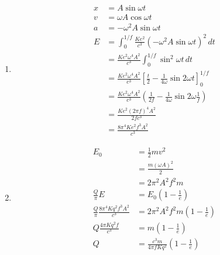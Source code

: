 \documentclass{article}
\begin{document}
\begin{enumerate}
  \item

        \begin{align*}
          x & = A \sin \omega t                                                                                            \\
          v & = \omega A \cos \omega t                                                                                     \\
          a & = -\omega^2 A \sin \omega t                                                                                  \\
          E & = \int_0^{1 / f} \frac{K e^2}{c^3} (-\omega^2 A \sin \omega t)^2 \,dt                                        \\
            & = \frac{K e^2 \omega^4 A^2}{c^3} \int_0^{1 / f} \sin^2 \omega t \,dt                                         \\
            & = \frac{K e^2 \omega^4 A^2}{c^3} \left[ \frac{t}{2} - \frac{1}{4 \omega} \sin 2 \omega t \right]_0^{1 / f}   \\
            & = \frac{K e^2 \omega^4 A^2}{c^3} \left( \frac{1}{2 f} - \frac{1}{4 \omega} \sin 2 \omega \frac{1}{f} \right) \\
            & = \frac{K e^2 (2 \pi f)^4 A^2}{2 f c^3}                                                                      \\
            & = \frac{8 \pi^4 K e^2 f^3 A^2}{c^3}
        \end{align*}

  \item

        \begin{align*}
          E_0                                             & = \frac{1}{2} m v^2                                          \\
                                                          & = \frac{m (\omega A)^2}{2}                                   \\
                                                          & = 2 \pi^2 A^2 f^2 m                                          \\
          \frac{Q}{\pi} E                                 & = E_0 \left( 1 - \frac{1}{e} \right)                         \\
          \frac{Q}{\pi} \frac{8 \pi^4 K q^2 f^3 A^2}{c^3} & = 2 \pi^2 A^2 f^2 m \left( 1 - \frac{1}{e} \right)           \\
          Q \frac{4 \pi K q^2 f}{c^3}                     & = m \left( 1 - \frac{1}{e} \right)                           \\
          Q                                               & = \frac{c^3 m}{4 \pi f K q^2} \left( 1 - \frac{1}{e} \right)
        \end{align*}
\end{enumerate}
\end{document}
